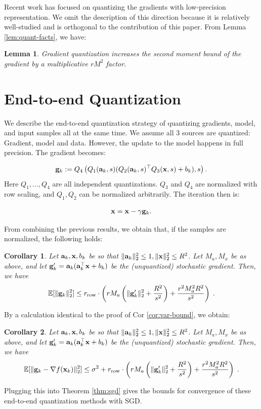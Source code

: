 \documentclass{article}
\def\a{{\bf a}}
\def\g{{\bf g}}
\def\x{{\bf x}}
\def\E{\mathbb{E}}
\def\rrow{r_\mathrm{row}}
\newtheorem{lemma}{Lemma}
\newtheorem{corollary}{Corollary}
\begin{document}
Recent work has focused on quantizing the gradients 
with low-precision representation.
We omit the description of this direction
because it is relatively well-studied and is orthogonal
to the contribution of this paper.
From Lemma \ref{lem:quant-facts}, we have:

\begin{lemma}
    \label{lem:gradient-quantization}
    Gradient quantization increases the second moment bound of the gradient by a multiplicative $r M^2$ factor. 
\end{lemma}


\section{End-to-end Quantization}

We describe the end-to-end quantization strategy of
quantizing gradients, model, and input samples all 
at the same time. We assume all 3 sources are quantized: Gradient, model and data. However, the update to the model happens in full precision. The gradient becomes:

\begin{eqnarray}
	\g_k := Q_4 \left( Q_1(\a_k, s ) ( Q_2(\a_k, s)^\top Q_3(\x, s) + b_k) , s \right).
\end{eqnarray}
\noindent Here $Q_1, \ldots, Q_4$ are all independent quantizations.  $Q_3$ and  $Q_4$ are normalized with row scaling, and $Q_1, Q_2$ can be normalized arbitrarily.
The iteration then is: 

\begin{eqnarray}
	\x = \x - \gamma \g_k.
\end{eqnarray}

\noindent From combining the previous results, we obtain that, if the samples are normalized, the following holds:

\begin{corollary}
    \label{cor:full-quantization}
    Let $\a_k, \x, b_k$ be so that $\| \a_k \|_2^2 \leq 1, \| \x \|_2^2 \leq R^2$.
    Let $M_a, M_x$ be as above, and let $\g'_k = \a_k (\a_k^\top \x + b_k)$ be the (unquantized) stochastic gradient.
    Then, we have
    \[
    \E [\| \g_k \|_2^2] \leq \rrow \cdot \left( r M_a \left( \| \g'_k \|_2^2 + \frac{R^2}{s^2} \right)  + \frac{r^2 M_a^2 R^2}{s^2} \right) \; .
    \]
\end{corollary}

By a calculation identical to the proof of Cor \ref{cor:var-bound}, we obtain:
\begin{corollary}
    \label{cor:full-quantizationVar}
    Let $\a_k, \x, b_k$ be so that $\| \a_k \|_2^2 \leq 1, \| \x \|_2^2 \leq R^2$.
    Let $M_a, M_x$ be as above, and let $\g'_k = \a_k (\a_k^\top \x + b_k)$ be the (unquantized) stochastic gradient.
    Then, we have
    \[
    \E [\| \g_k - \nabla f(\x_k) \|_2^2] \leq \sigma^2 + \rrow \cdot \left( r M_a \left( \| \g'_k \|_2^2 + \frac{R^2}{s^2} \right)  + \frac{r^2 M_a^2 R^2}{s^2} \right) \; .
    \]
\end{corollary}
Plugging this into Theorem \ref{thm:sgd} gives the bounds for convergence of these end-to-end quantization methods with SGD.
\end{document}
